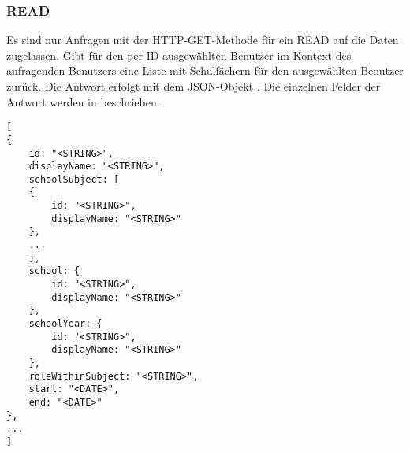\subsubsection{READ}
\label{sec:rest:api:users:id:subjects:read}
Es sind nur Anfragen mit der HTTP-GET-Methode für ein READ auf die Daten zugelassen.
Gibt für den per ID ausgewählten Benutzer im Kontext des anfragenden Benutzers eine Liste mit Schulfächern für den ausgewählten Benutzer zurück.
Die Antwort erfolgt mit dem JSON-Objekt . 
Die einzelnen Felder der Antwort werden in  beschrieben.

\begin{lstlisting}[caption={JSON-Antwort für einen GET-Aufruf des Pfads /api/users/\$id/subjects},label={lst:code:rest:api:users:id:subjects:read:ret},frame=tlrb]
[
{
	id: "<STRING>",
	displayName: "<STRING>",
	schoolSubject: [
	{
		id: "<STRING>",
		displayName: "<STRING>"
	},
	...
	],
	school: {
		id: "<STRING>",
		displayName: "<STRING>"
	},
	schoolYear: {
		id: "<STRING>",
		displayName: "<STRING>"
	},
	roleWithinSubject: "<STRING>",
	start: "<DATE>",
	end: "<DATE>" 		
},
...
]
\end{lstlisting}

